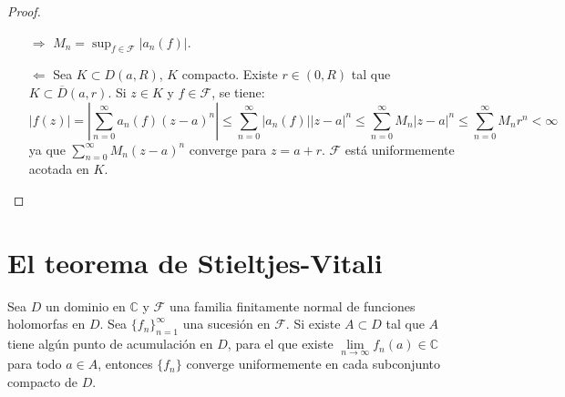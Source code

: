 \begin{proof}
    \hfill
    \begin{itemize}
        \item[$\Rightarrow$] $M_n = \sup_{f \in \mathcal{F}} |a_n(f)|$.
        \item[$\Leftarrow$] Sea $K \subset D(a, R)$, $K$ compacto.
            Existe $r \in (0, R)$ tal que $K \subset \overline{D}(a, r)$.
            Si $z \in K$ y $f \in \mathcal{F}$, se tiene:
            $$|f(z)| = \left|\sum_{n=0}^\infty a_n(f)(z-a)^n\right| \leq \sum_{n=0}^\infty |a_n(f)||z-a|^n \leq \sum_{n=0}^\infty M_n|z-a|^n \leq \sum_{n=0}^\infty M_nr^n < \infty$$
            ya que $\sum_{n=0}^\infty M_n(z-a)^n$ converge para $z = a+r$.
            $\mathcal{F}$ está uniformemente acotada en $K$.
    \end{itemize}
\end{proof}

\section{El teorema de Stieltjes-Vitali}
\begin{theorem}
    Sea $D$ un dominio en $\mathbb{C}$ y $\mathcal{F}$ una familia finitamente normal de funciones holomorfas en $D$.
    Sea $\{f_n\}_{n=1}^\infty$ una sucesión en $\mathcal{F}$.
    Si existe $A \subset D$ tal que $A$ tiene algún punto de acumulación en $D$, para el que existe $\lim\limits_{n \to \infty} f_n(a) \in \mathbb{C}$ para todo $a \in A$, entonces $\{f_n\}$ converge uniformemente en cada subconjunto compacto de $D$.
\end{theorem}

